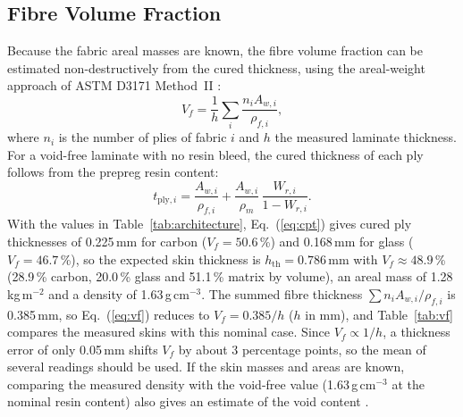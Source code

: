 \documentclass[11pt,a4paper]{article}
\newenvironment{addedblock}{\color{addgreen}}{}
\newenvironment{addedblock}{}{}
\begin{document}
\begin{addedblock}
\subsection{Fibre Volume Fraction}

Because the fabric areal masses are known, the fibre volume fraction
can be estimated non-destructively from the cured thickness, using
the areal-weight approach of ASTM D3171 Method~II \citep{astm_d3171}:
\begin{equation}
    V_f = \frac{1}{h}\sum_i \frac{n_i A_{w,i}}{\rho_{f,i}},
    \label{eq:vf}
\end{equation}
where $n_i$ is the number of plies of fabric $i$ and $h$ the measured
laminate thickness. For a void-free laminate with no resin bleed, the
cured thickness of each ply follows from the prepreg resin content:
\begin{equation}
    t_{\mathrm{ply},i} = \frac{A_{w,i}}{\rho_{f,i}}
    + \frac{A_{w,i}}{\rho_m}\,\frac{W_{r,i}}{1-W_{r,i}}.
    \label{eq:cpt}
\end{equation}
With the values in Table~\ref{tab:architecture}, Eq.~(\ref{eq:cpt})
gives cured ply thicknesses of 0.225\,mm for carbon ($V_f=50.6$\,\%)
and 0.168\,mm for glass ($V_f=46.7$\,\%), so the expected skin
thickness is $h_\mathrm{th}=0.786$\,mm with $V_f\approx48.9$\,\%
(28.9\,\% carbon, 20.0\,\% glass and 51.1\,\% matrix by volume), an
areal mass of 1.28\,kg\,m$^{-2}$ and a density of 1.63\,g\,cm$^{-3}$.
The summed fibre thickness $\sum n_i A_{w,i}/\rho_{f,i}$ is 0.385\,mm,
so Eq.~(\ref{eq:vf}) reduces to $V_f = 0.385/h$ ($h$ in mm), and
Table~\ref{tab:vf} compares the measured skins with this nominal case.
Since $V_f \propto 1/h$, a thickness error of only 0.05\,mm shifts
$V_f$ by about 3 percentage points, so the mean of several readings
should be used. If the skin masses and areas are known, comparing the
measured density with the void-free value (1.63\,g\,cm$^{-3}$ at the
nominal resin content) also gives an estimate of the void content
\citep{astm_d3171}.
\end{addedblock}
\end{document}
